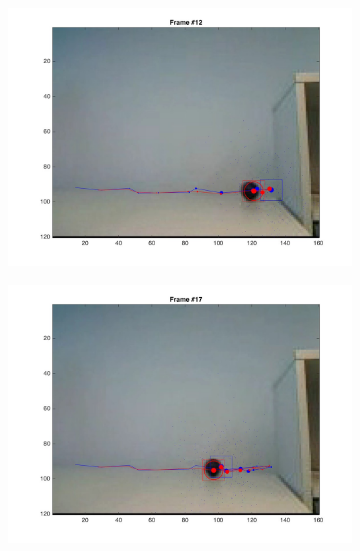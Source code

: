 \documentclass{ethz_report}
\begin{document}
\begin{figure}[h]
\begin{subfigure}[b]{.25\textwidth}
        \centering
        \includegraphics[width=1\linewidth]{images/video3__11}
    \end{subfigure}%
    \begin{subfigure}[b]{.25\textwidth}
        \centering
        \includegraphics[width=1\linewidth]{images/video3__16}
    \end{subfigure}
    \begin{subfigure}[b]{.25\textwidth}
        \centering

\end{subfigure}
\end{figure}
\end{document}
